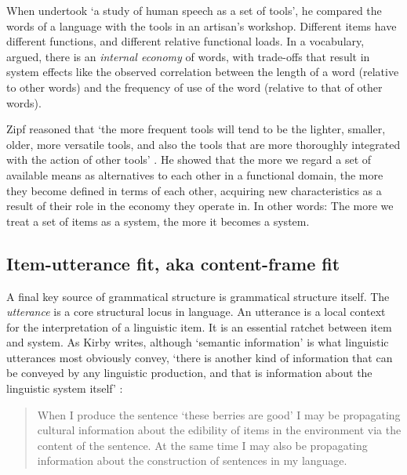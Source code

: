 When \citet[19ff]{zipf_human_1949} undertook \textquoteleft a study of human speech as a set of 
tools', he compared the words of a language with the tools in an 
artisan's workshop. Different items have different functions, and different relative functional loads. In a vocabulary, \citet[21]{zipf_human_1949} 
argued, there is an \textit{internal economy} of words, with trade-offs 
that result in system effects like the observed correlation between 
the length of a word (relative to other words) and the frequency of use 
of the word (relative to that of other words). 



Zipf reasoned that \textquoteleft the more frequent tools will tend to be the lighter, 
smaller, older, more versatile tools, and also the tools that are more 
thoroughly integrated with the action of other tools' \citep[73]{zipf_human_1949}. He 
showed that the more we regard a set of available means as alternatives 
to each other in a functional domain, the more they become defined in 
terms of each other, acquiring new characteristics as a result of their 
role in the economy they operate in. In other words: The more we 
treat a set of items as a system, the more it becomes a system.



\subsection{Item-utterance fit, aka content-frame fit}
\label{itemutterance}

A final key source of grammatical structure is grammatical 
structure itself. The \textit{utterance }is a core structural locus in 
language. An utterance is a local context for the interpretation of a 
linguistic item. It is an essential ratchet between item 
and system. As Kirby writes, although \textquoteleft semantic information' is what 
linguistic utterances most obviously convey, \textquoteleft there is another kind of 
information that can be conveyed by any linguistic production, and that 
is information about the linguistic system itself' \citep[123]{kirby_transitions:_2013}: 

\begin{quotation}
When I produce the sentence \textquoteleft these berries are good' I may 
be propagating cultural information about the edibility of items in the 
environment via the content of the sentence. At the same time I may also 
be propagating information about the construction of sentences in my 
language.
\end{quotation}

